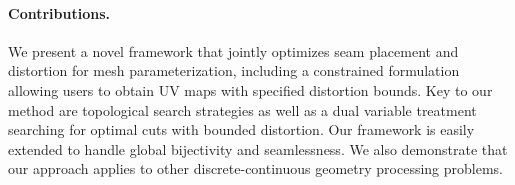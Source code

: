 \paragraph*{Contributions.} 
We present a novel framework that jointly optimizes seam placement and distortion for mesh parameterization,  including a constrained formulation allowing users to obtain UV maps with specified distortion bounds. Key to our method are topological search strategies as well as a dual variable treatment searching for optimal cuts with bounded distortion. Our framework is easily extended to handle global bijectivity and seamlessness.    We also demonstrate that our approach applies to other discrete-continuous geometry processing problems.%
